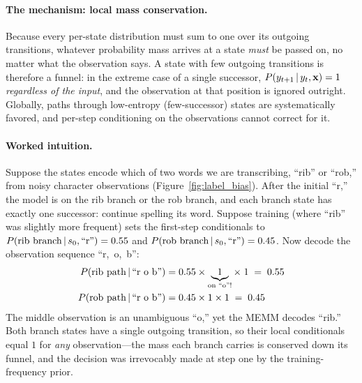 \paragraph{The mechanism: local mass conservation.}
Because every per-state distribution must sum to one over its outgoing
transitions, whatever probability mass arrives at a state \emph{must} be
passed on, no matter what the observation says.  A state with few outgoing
transitions is therefore a funnel: in the extreme case of a single successor,
$P(y_{t+1} \,|\, y_t, \mathbf{x}) = 1$ \emph{regardless of the input}, and the
observation at that position is ignored outright.  Globally, paths through
low-entropy (few-successor) states are systematically favored, and per-step
conditioning on the observations cannot correct for it.

\paragraph{Worked intuition.}
Suppose the states encode which of two words we are transcribing, ``rib'' or
``rob,'' from noisy character observations (Figure~\ref{fig:label_bias}).
After the initial ``r,'' the model is on the rib branch or the rob branch, and
each branch state has exactly one successor: continue spelling its word.
Suppose training (where ``rib'' was slightly more frequent) sets the
first-step conditionals to
$P(\text{rib branch} \,|\, s_0, \text{``r''}) = 0.55$ and
$P(\text{rob branch} \,|\, s_0, \text{``r''}) = 0.45$.  Now decode the
observation sequence ``r,~o,~b'':
\begin{align*}
P(\text{rib path} \,|\, \text{``r o b''})
&= 0.55 \times \underbrace{1}_{\text{on ``o''!}} \times\; 1 \;=\; 0.55 \\
P(\text{rob path} \,|\, \text{``r o b''})
&= 0.45 \times 1 \times 1 \;=\; 0.45
\end{align*}
The middle observation is an unambiguous ``o,'' yet the MEMM decodes
``rib.''  Both branch states have a single outgoing transition, so their local
conditionals equal $1$ for \emph{any} observation---the mass each branch
carries is conserved down its funnel, and the decision was irrevocably made at
step one by the training-frequency prior.

